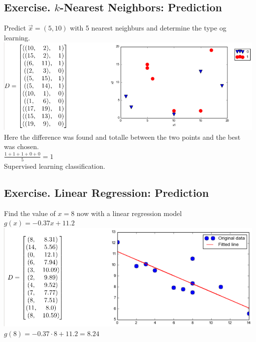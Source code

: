 \documentclass[12pt, a4paper]{article}
\begin{document}
		\subsection{Exercise. $k$-Nearest Neighbors: Prediction}
			Predict $\vec{x}=(5,10)$ with 5 nearest neighburs and determine the type og learning.\\
			\includegraphics[width=\linewidth]{images/41,2.png}\\
			Here the difference was found and totalle between the two points and the best was chosen.\\
			$\frac{1+1+1+0+0}{5}=1$\\
			Supervised learning classification.
		\subsection{Exercise. Linear Regression: Prediction}
			Find the value of $x=8$ now with a linear regression model $g(x)=-0.37x+11.2$\\
			\includegraphics[width=\linewidth]{images/41,3.png}\\
			$g(8)=-0.37\cdot 8+11.2=8.24$\\
\end{document}
